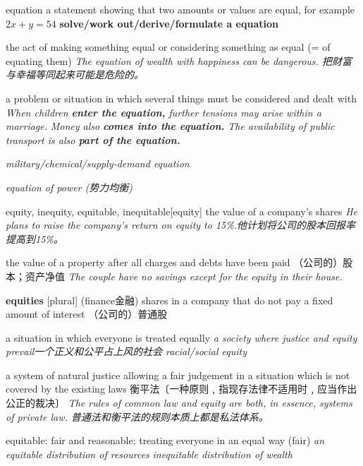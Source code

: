 \begin{DefWord}{equation}
    a statement showing that two amounts or values are equal, for example $2x + y = 54$
    \textbf{solve/work out/derive/formulate a equation}


    the act of making something equal or considering something as equal (= of equating them)
    \textit{The equation of wealth with happiness can be dangerous. 把财富与幸福等同起来可能是危险的。}

    a problem or situation in which several things must be considered and dealt with
    \textit{When children \textbf{enter the equation,} further tensions may arise within a marriage.}
    \textit{Money also \textbf{comes into the equation.}}
    \textit{The availability of public transport is also \textbf{part of the equation.}}

    \textit{military/chemical/supply-demand equation}
    
    \textit{equation of power (势力均衡)}
\end{DefWord}

\begin{DefWord}{equity, inequity, equitable, inequitable}[equity]
    the value of a company's shares
    \textit{He plans to raise the company's return on equity to 15\%.他计划将公司的股本回报率提高到15\%。}

    the value of a property after all charges and debts have been paid （公司的）股本；资产净值
    \textit{The couple have no savings except for the equity in their house.}

    \textbf{equities} [plural] (finance金融) shares in a company that do not pay a fixed amount of interest （公司的）普通股



    a situation in which everyone is treated equally 
    \textit{a society where justice and equity prevail一个正义和公平占上风的社会}
    \textit{racial/social equity}

    a system of natural justice allowing a fair judgement in a situation which is not covered by the existing laws 衡平法〔一种原则﹐指现存法律不适用时﹐应当作出公正的裁决〕
    \textit{The rules of common law and equity are both, in essence, systems of private law. 普通法和衡平法的规则本质上都是私法体系。}

    equitable: fair and reasonable; treating everyone in an equal way (fair)
    \textit{an equitable distribution of resources}
    \textit{inequitable distribution of wealth}
\end{DefWord}

